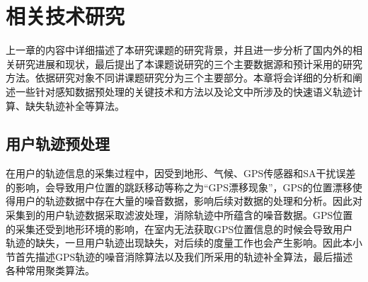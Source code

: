 \chapter{相关技术研究}
\label{chap:chapter02}
上一章的内容中详细描述了本研究课题的研究背景，并且进一步分析了国内外的相关研究进展和现状，最后提出了本课题说研究的三个主要数据源和预计采用的研究方法。依据研究对象不同讲课题研究分为三个主要部分。本章将会详细的分析和阐述一些针对感知数据预处理的关键技术和方法以及论文中所涉及的快速语义轨迹计算、缺失轨迹补全等算法。
\section{用户轨迹预处理}
\label{sec:section2-1}
在用户的轨迹信息的采集过程中，因受到地形、气候、GPS传感器和SA干扰误差的影响，会导致用户位置的跳跃移动等称之为“GPS漂移现象”，GPS的位置漂移使得用户的轨迹数据中存在大量的噪音数据，影响后续对数据的处理和分析。因此对采集到的用户轨迹数据采取滤波处理，消除轨迹中所蕴含的噪音数据。GPS位置的采集还受到地形环境的影响，在室内无法获取GPS位置信息的时候会导致用户轨迹的缺失，一旦用户轨迹出现缺失，对后续的度量工作也会产生影响。因此本小节首先描述GPS轨迹的噪音消除算法以及我们所采用的轨迹补全算法，最后描述各种常用聚类算法。

